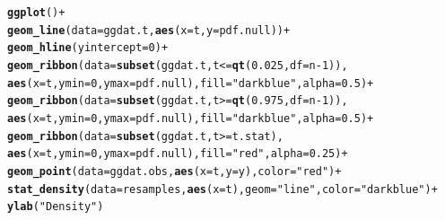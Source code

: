 \documentclass{article}\usepackage[]{graphicx}\usepackage[]{xcolor}
\makeatletter
\newcommand{\hlnum}[1]{\textcolor[rgb]{0.686,0.059,0.569}{#1}}%
\newcommand{\hlsng}[1]{\textcolor[rgb]{0.192,0.494,0.8}{#1}}%
\newcommand{\hlopt}[1]{\textcolor[rgb]{0,0,0}{#1}}%
\newcommand{\hldef}[1]{\textcolor[rgb]{0.345,0.345,0.345}{#1}}%
\newcommand{\hlkwc}[1]{\textcolor[rgb]{0.333,0.667,0.333}{#1}}%
\newcommand{\hlkwd}[1]{\textcolor[rgb]{0.737,0.353,0.396}{\textbf{#1}}}%
\newenvironment{kframe}{%
 \def\at@end@of@kframe{}%
 \ifinner\ifhmode%
  \def\at@end@of@kframe{\end{minipage}}%
  \begin{minipage}{\columnwidth}%
 \fi\fi%
 \def\FrameCommand##1{\hskip\@totalleftmargin \hskip-\fboxsep
 \colorbox{shadecolor}{##1}\hskip-\fboxsep
     \hskip-\linewidth \hskip-\@totalleftmargin \hskip\columnwidth}%
 \MakeFramed {\advance\hsize-\width
   \@totalleftmargin\z@ \linewidth\hsize
   \@setminipage}}%
 {\par\unskip\endMakeFramed%
 \at@end@of@kframe}
\newenvironment{knitrout}{}{} %
\makeatother
\begin{document}
\begin{enumerate}
\begin{enumerate}
\begin{knitrout}
\begin{kframe}
\begin{alltt}
\hlkwd{ggplot}\hldef{()} \hlopt{+}
  \hlkwd{geom_line}\hldef{(}\hlkwc{data} \hldef{= ggdat.t,} \hlkwd{aes}\hldef{(}\hlkwc{x} \hldef{= t,} \hlkwc{y} \hldef{= pdf.null))} \hlopt{+}
  \hlkwd{geom_hline}\hldef{(}\hlkwc{yintercept} \hldef{=} \hlnum{0}\hldef{)} \hlopt{+}
  \hlkwd{geom_ribbon}\hldef{(}\hlkwc{data} \hldef{=} \hlkwd{subset}\hldef{(ggdat.t, t} \hlopt{<=} \hlkwd{qt}\hldef{(}\hlnum{0.025}\hldef{,} \hlkwc{df} \hldef{= n} \hlopt{-} \hlnum{1}\hldef{)),}
              \hlkwd{aes}\hldef{(}\hlkwc{x} \hldef{= t,} \hlkwc{ymin} \hldef{=} \hlnum{0}\hldef{,} \hlkwc{ymax} \hldef{= pdf.null),} \hlkwc{fill} \hldef{=} \hlsng{"darkblue"}\hldef{,} \hlkwc{alpha} \hldef{=} \hlnum{0.5}\hldef{)} \hlopt{+}
  \hlkwd{geom_ribbon}\hldef{(}\hlkwc{data} \hldef{=} \hlkwd{subset}\hldef{(ggdat.t, t} \hlopt{>=} \hlkwd{qt}\hldef{(}\hlnum{0.975}\hldef{,} \hlkwc{df} \hldef{= n} \hlopt{-} \hlnum{1}\hldef{)),}
              \hlkwd{aes}\hldef{(}\hlkwc{x} \hldef{= t,} \hlkwc{ymin} \hldef{=} \hlnum{0}\hldef{,} \hlkwc{ymax} \hldef{= pdf.null),} \hlkwc{fill} \hldef{=} \hlsng{"darkblue"}\hldef{,} \hlkwc{alpha} \hldef{=} \hlnum{0.5}\hldef{)} \hlopt{+}
  \hlkwd{geom_ribbon}\hldef{(}\hlkwc{data} \hldef{=} \hlkwd{subset}\hldef{(ggdat.t, t} \hlopt{>=} \hldef{t.stat),}
              \hlkwd{aes}\hldef{(}\hlkwc{x} \hldef{= t,} \hlkwc{ymin} \hldef{=} \hlnum{0}\hldef{,} \hlkwc{ymax} \hldef{= pdf.null),} \hlkwc{fill} \hldef{=} \hlsng{"red"}\hldef{,} \hlkwc{alpha} \hldef{=} \hlnum{0.25}\hldef{)} \hlopt{+}
  \hlkwd{geom_point}\hldef{(}\hlkwc{data} \hldef{= ggdat.obs,} \hlkwd{aes}\hldef{(}\hlkwc{x} \hldef{= t,} \hlkwc{y} \hldef{= y),} \hlkwc{color} \hldef{=} \hlsng{"red"}\hldef{)} \hlopt{+}
  \hlkwd{stat_density}\hldef{(}\hlkwc{data} \hldef{= resamples,} \hlkwd{aes}\hldef{(}\hlkwc{x} \hldef{= t),} \hlkwc{geom} \hldef{=} \hlsng{"line"}\hldef{,} \hlkwc{color} \hldef{=} \hlsng{"darkblue"}\hldef{)} \hlopt{+}
  \hlkwd{ylab}\hldef{(}\hlsng{"Density"}\hldef{)}
\end{alltt}
\end{kframe}

\end{knitrout}
\end{enumerate}
\end{enumerate}
\end{document}

